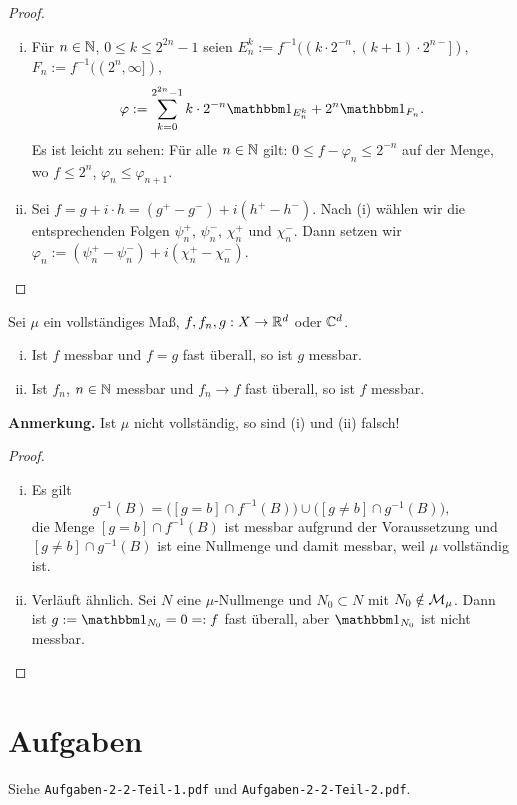 \begin{proof}
 \begin{enumerate}[(i)]
  \item Für $n \in \mathbb{N}$, $0 \le k \le 2^{2n}-1$ seien $E_n^k := f^{-1} (( k \cdot 2^{-n} , (k+1) \cdot 2^{n-} ] )$, $F_n := f^{-1}((2^n, \infty])$, 
  \[ \varphi := \sum_{k=0}^{2^{2n} - 1} k \cdot 2^{-n} \ind_{E_n^k} + 2^n \ind_{F_n}. \]
  Es ist leicht zu sehen: Für alle $n \in \mathbb{N}$ gilt: $0 \le f - \varphi_n \le 2^{-n}$ auf der Menge, wo $f \le 2^n$, $\varphi_n \le \varphi_{n+1}$.
  \item Sei $f = g + i \cdot h = (g^+ - g^-) + i( h^+ - h^- )$. Nach (i) wählen wir die entsprechenden Folgen $\psi_n^+$, $\psi_n^-$, $\chi_n^+$ und $\chi_n^-$. Dann setzen wir $\varphi_n := (\psi_n^+  - \psi_n^-) + i(\chi_n^+ - \chi_n^-)$. \qedhere
 \end{enumerate}
\end{proof}

\begin{lem}
 Sei $\mu$ ein vollständiges Maß, $f,f_n,g: X \to \mathbb{R}^d$ oder $\mathbb{C}^d$.
 \begin{enumerate}[(i)]
  \item Ist $f$ messbar und $f=g$ fast überall, so ist $g$ messbar.
  \item Ist $f_n$, $n \in \mathbb{N}$ messbar und $f_n \to f$ fast überall, so ist $f$ messbar.
 \end{enumerate}
\end{lem}

\textbf{Anmerkung.}
Ist $\mu$ nicht vollständig, so sind (i) und (ii) falsch!

\begin{proof}
 \begin{enumerate}[(i)]
  \item Es gilt
  \[ g^{-1}(B) = \Big( [g=b] \cap f^{-1}(B) \Big) \cup \Big( [g \ne b] \cap g^{-1}(B) \Big), \]
  die Menge $[g=b] \cap f^{-1}(B)$ ist messbar aufgrund der Voraussetzung und $[g \ne b] \cap g^{-1}(B)$ ist eine Nullmenge und damit messbar, weil $\mu$ vollständig ist.
  \item Verläuft ähnlich. Sei $N$ eine $\mu$-Nullmenge und $N_0 \subset N$ mit $N_0 \notin \mathcal{M}_\mu$. Dann ist $g := \ind_{N_0} = 0 =: f$ fast überall, aber $\ind_{N_0}$ ist nicht messbar. \qedhere
 \end{enumerate}
\end{proof}

\section{Aufgaben}
Siehe \verb+Aufgaben-2-2-Teil-1.pdf+ und \verb+Aufgaben-2-2-Teil-2.pdf+.

